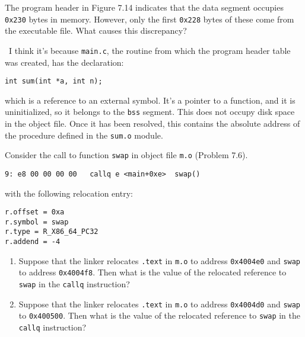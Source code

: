 \documentclass[12pt]{article}
\newenvironment{ex}[2][Exercise]{\begin{trivlist}
		\item[\hskip \labelsep {\bfseries #1}\hskip \labelsep {\bfseries #2.}]}{\end{trivlist}}
\newenvironment{sol}[1][Solution]{\begin{trivlist}
		\item[\hskip \labelsep {\bfseries #1:}]}{\end{trivlist}}
\begin{document}
\begin{ex}{7.11}
	The program header in Figure 7.14 indicates that the data segment occupies \texttt{0x230} bytes
	in memory. However, only the first \texttt{0x228} bytes of these come from the executable file.
	What causes this discrepancy?
\end{ex}

\begin{sol}
	\
	I think it's because \texttt{main.c}, the routine from which the program header table was created,
	has the declaration:
	\begin{lstlisting}
int sum(int *a, int n);
	\end{lstlisting}
	which is a reference to an external symbol. It's a pointer to a function, and it is uninitialized,
	so it belongs to the \texttt{bss} segment. This does not occupy disk space in the object file. Once
	it has been resolved, this contains the absolute address of the procedure defined in the \texttt{sum.o}
	module.
\end{sol}

\begin{ex}{7.12}
	Consider the call to function \texttt{swap} in object file \texttt{m.o} (Problem 7.6).
	\begin{lstlisting}[language={}]
9: e8 00 00 00 00	callq e <main+0xe>	swap()
	\end{lstlisting}
	with the following relocation entry:
	\begin{lstlisting}[language={}]
r.offset = 0xa
r.symbol = swap
r.type = R_X86_64_PC32
r.addend = -4
	\end{lstlisting}
	\begin{enumerate}[label=(\alph*)]
		\item Suppose that the linker relocates \texttt{.text} in \texttt{m.o} to address \texttt{0x4004e0}
		and \texttt{swap} to address \texttt{0x4004f8}. Then what is the value of the relocated reference to
		\texttt{swap} in the \texttt{callq} instruction?
		\item Suppose that the linker relocates \texttt{.text} in \texttt{m.o} to address \texttt{0x4004d0}
		and \texttt{swap} to \texttt{0x400500}. Then what is the value of the relocated reference to
		\texttt{swap} in the \texttt{callq} instruction?
	\end{enumerate}
\end{ex}
\end{document}
